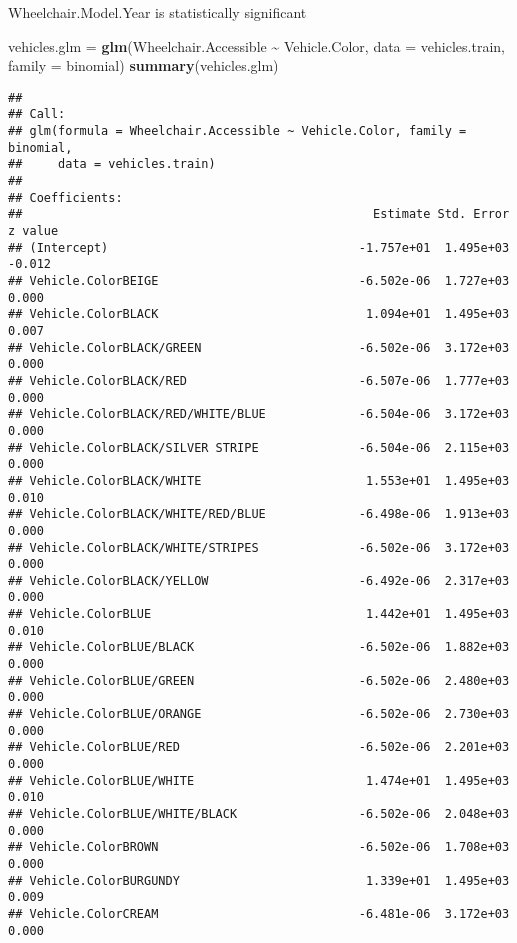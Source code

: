 \documentclass[
]{article}
\newenvironment{Shaded}{\begin{snugshade}}{\end{snugshade}}
\newcommand{\AttributeTok}[1]{\textcolor[rgb]{0.13,0.29,0.53}{#1}}
\newcommand{\FunctionTok}[1]{\textcolor[rgb]{0.13,0.29,0.53}{\textbf{#1}}}
\newcommand{\NormalTok}[1]{#1}
\newcommand{\OtherTok}[1]{\textcolor[rgb]{0.56,0.35,0.01}{#1}}
\newcommand{\SpecialCharTok}[1]{\textcolor[rgb]{0.81,0.36,0.00}{\textbf{#1}}}
\begin{document}
Wheelchair.Model.Year is statistically significant

\begin{Shaded}
\begin{Highlighting}[]
\NormalTok{vehicles.glm }\OtherTok{=} \FunctionTok{glm}\NormalTok{(Wheelchair.Accessible }\SpecialCharTok{\textasciitilde{}}\NormalTok{ Vehicle.Color, }\AttributeTok{data =}\NormalTok{ vehicles.train, }
                   \AttributeTok{family =}\NormalTok{ binomial)}
\FunctionTok{summary}\NormalTok{(vehicles.glm)}
\end{Highlighting}
\end{Shaded}

\begin{verbatim}
## 
## Call:
## glm(formula = Wheelchair.Accessible ~ Vehicle.Color, family = binomial, 
##     data = vehicles.train)
## 
## Coefficients:
##                                                 Estimate Std. Error z value
## (Intercept)                                   -1.757e+01  1.495e+03  -0.012
## Vehicle.ColorBEIGE                            -6.502e-06  1.727e+03   0.000
## Vehicle.ColorBLACK                             1.094e+01  1.495e+03   0.007
## Vehicle.ColorBLACK/GREEN                      -6.502e-06  3.172e+03   0.000
## Vehicle.ColorBLACK/RED                        -6.507e-06  1.777e+03   0.000
## Vehicle.ColorBLACK/RED/WHITE/BLUE             -6.504e-06  3.172e+03   0.000
## Vehicle.ColorBLACK/SILVER STRIPE              -6.504e-06  2.115e+03   0.000
## Vehicle.ColorBLACK/WHITE                       1.553e+01  1.495e+03   0.010
## Vehicle.ColorBLACK/WHITE/RED/BLUE             -6.498e-06  1.913e+03   0.000
## Vehicle.ColorBLACK/WHITE/STRIPES              -6.502e-06  3.172e+03   0.000
## Vehicle.ColorBLACK/YELLOW                     -6.492e-06  2.317e+03   0.000
## Vehicle.ColorBLUE                              1.442e+01  1.495e+03   0.010
## Vehicle.ColorBLUE/BLACK                       -6.502e-06  1.882e+03   0.000
## Vehicle.ColorBLUE/GREEN                       -6.502e-06  2.480e+03   0.000
## Vehicle.ColorBLUE/ORANGE                      -6.502e-06  2.730e+03   0.000
## Vehicle.ColorBLUE/RED                         -6.502e-06  2.201e+03   0.000
## Vehicle.ColorBLUE/WHITE                        1.474e+01  1.495e+03   0.010
## Vehicle.ColorBLUE/WHITE/BLACK                 -6.502e-06  2.048e+03   0.000
## Vehicle.ColorBROWN                            -6.502e-06  1.708e+03   0.000
## Vehicle.ColorBURGUNDY                          1.339e+01  1.495e+03   0.009
## Vehicle.ColorCREAM                            -6.481e-06  3.172e+03   0.000

\end{verbatim}
\end{document}
